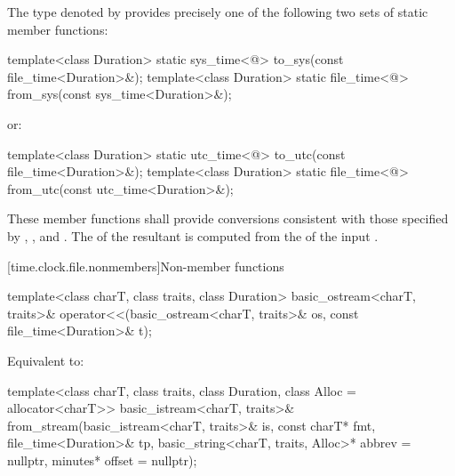 %
\pnum
The type denoted by  provides
precisely one of the following two sets of static member functions:

\begin{codeblock}
template<class Duration>
  static sys_time<@\seebelow@>
    to_sys(const file_time<Duration>&);
template<class Duration>
  static file_time<@\seebelow@>
    from_sys(const sys_time<Duration>&);
\end{codeblock}

or:

\begin{codeblock}
template<class Duration>
  static utc_time<@\seebelow@>
    to_utc(const file_time<Duration>&);
template<class Duration>
  static file_time<@\seebelow@>
    from_utc(const utc_time<Duration>&);
\end{codeblock}

These member functions shall provide  conversions
consistent with those specified by
, , and .
The  of the resultant 
is computed from the  of the input .

[time.clock.file.nonmembers]{Non-member functions}

%
\begin{itemdecl}
template<class charT, class traits, class Duration>
  basic_ostream<charT, traits>&
    operator<<(basic_ostream<charT, traits>& os, const file_time<Duration>& t);
\end{itemdecl}

\begin{itemdescr}
\pnum
\effects
Equivalent to:
\end{itemdescr}

%
\begin{itemdecl}
template<class charT, class traits, class Duration, class Alloc = allocator<charT>>
  basic_istream<charT, traits>&
    from_stream(basic_istream<charT, traits>& is, const charT* fmt,
                file_time<Duration>& tp, basic_string<charT, traits, Alloc>* abbrev = nullptr,
                minutes* offset = nullptr);
\end{itemdecl}

